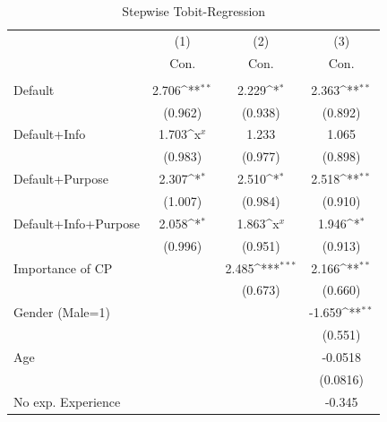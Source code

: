 \documentclass[review, authoryear,12pt]{elsarticle}
\begin{document}
\begin{table}[htbp]\centering
\begin{adjustbox}{max width=\textwidth}
\def\sym#1{\ifmmode^{#1}\else\(^{#1}\)\fi}
\caption{Stepwise Tobit-Regression\label{tab4}}
\begin{tabular}{l*{3}{c}}
\hline\hline
                    &\multicolumn{1}{c}{(1)}&\multicolumn{1}{c}{(2)}&\multicolumn{1}{c}{(3)}\\
                    &\multicolumn{1}{c}{Con.}&\multicolumn{1}{c}{Con.}&\multicolumn{1}{c}{Con.}\\
\hline
               &                     &                     &                     \\
Default             &       2.706\sym{**} &       2.229\sym{*}  &       2.363\sym{**} \\
                    &     (0.962)         &     (0.938)         &     (0.892)         \\
Default+Info        &       1.703\sym{x}  &       1.233         &       1.065         \\
                    &     (0.983)         &     (0.977)         &     (0.898)         \\
Default+Purpose     &       2.307\sym{*}  &       2.510\sym{*}  &       2.518\sym{**} \\
                    &     (1.007)         &     (0.984)         &     (0.910)         \\
Default+Info+Purpose&       2.058\sym{*}  &       1.863\sym{x}  &       1.946\sym{*}  \\
                    &     (0.996)         &     (0.951)         &     (0.913)         \\
Importance of CP       &                     &       2.485\sym{***}&       2.166\sym{**} \\
                    &                     &     (0.673)         &     (0.660)         \\
Gender (Male=1)                &                     &                     &      -1.659\sym{**} \\
                    &                     &                     &     (0.551)         \\
Age                 &                     &                     &     -0.0518         \\
                    &                     &                     &    (0.0816)         \\
No exp. Experience        &                     &                     &      -0.345         \\

\end{tabular}
\end{adjustbox}
\end{table}
\end{document}
